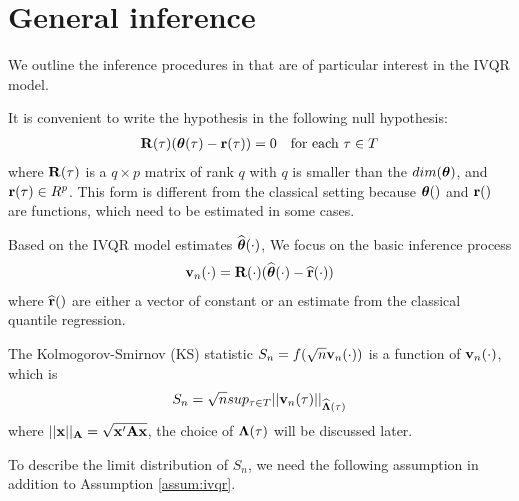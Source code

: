 \section{General inference} \label{sec:infer}
We outline the inference procedures in \cite{Chernozhukov2006} that are of
particular interest in the IVQR model.

It is convenient to write the hypothesis in the following null hypothesis:
\begin{align}
  \mathbf{R}(\tau)(\boldsymbol{\theta}(\tau) - \mathbf{r}(\tau)) = 0
  \quad
  \text{for each $\tau \in T$}
\end{align}
where $\mathbf{R}(\tau)$ is a $q \times p$ matrix of rank $q$ with $q$ is smaller than
the $dim(\boldsymbol{\theta})$, and $\mathbf{r}(\tau) \in R^p$. This form is different from the
classical setting because $\boldsymbol{\theta}()$ and $\mathbf{r}()$ are functions, which need to
be estimated in some cases.

Based on the IVQR model estimates $\widehat{\boldsymbol{\theta}}(\cdot)$, We focus on the basic
inference process
\begin{align}
  \mathbf{v}_n(\cdot) = \mathbf{R}(\cdot)(\widehat{\boldsymbol{\theta}}(\cdot) - \widehat{\mathbf{r}}(\cdot))
\end{align}
where $\widehat{\mathbf{r}}()$ are either a vector of constant or an estimate from the
classical quantile regression.

The Kolmogorov-Smirnov (KS) statistic $S_n = f(\sqrt{n}\mathbf{v}_n(\cdot))$ is a
function of $\mathbf{v}_n(\cdot)$, which is
\begin{align}
  S_n = \sqrt{n} sup_{\tau \in T} ||\mathbf{v}_n(\tau)||_{\widehat{\boldsymbol{\Lambda}}(\tau)}
\end{align}
where $||\mathbf{x}||_{\mathbf{A}} = \sqrt{\mathbf{x}'\mathbf{A}\mathbf{x}}$, the choice of $\boldsymbol{\Lambda}(\tau)$ will be
discussed later.


To describe the limit distribution of $S_n$, we need the following assumption in
addition to Assumption \ref{assum:ivqr}.

